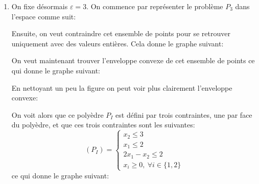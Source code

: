 {\begin{td-sol}[]
\begin{enumerate}
            

            Quelques remarques par rapport à la figure:
            \begin{itemize}
                \item Tout d'abord on peut remarquer que l'ensemble des points dans le polyèdre est complètement borné cette fois-ci.
                Contrairement au cas \(\varepsilon = -1\), on ne peut pas choisir n'importe quelle valeur pour \(x_1\).
                \item Les points extrêmes de ce polyèdre sont:
                \begin{equation*}
                    (0, 0), (0, 3), (1, 3), (4, 0)
                \end{equation*}
                \item Ces deux problèmes, même s'ils viennent tous deux de \(P_\varepsilon\) ont des représentations dans l'espace bien différentes, cela est notamment dû à l'impact qu'a le choix de \(\varepsilon\) sur le signe des variables \(x_1\) et \(x_2\) dans la seconde contrainte. C'est ce qui décide \og{}l'angle de la pente\fg{} de cette contrainte et qui permet donc de borner ou non le polyèdre.
            \end{itemize}

            \item On fixe désormais \(\varepsilon = 3\). On commence par représenter le problème \(P_3\) dans l'espace comme suit:

            

            Ensuite, on veut contraindre cet ensemble de points pour se retrouver uniquement avec des valeurs entières. 
            Cela donne le graphe suivant:

            

            On veut maintenant trouver l'enveloppe convexe de cet ensemble de points ce qui donne le graphe suivant:

            

            En nettoyant un peu la figure on peut voir plus clairement l'enveloppe convexe:

            

            On voit alors que ce polyèdre \(P_I\) est défini par trois contraintes, une par face du polyèdre, et que ces trois contraintes sont les suivantes:
            \begin{equation*}
                (P_I) = 
                \begin{cases}
                    x_2 \leq 3\\
                    x_1 \leq 2\\
                    2x_1 - x_2 \leq 2\\
                    x_i \geq 0,\ \forall i \in \{1, 2\}
                \end{cases}
            \end{equation*}
            ce qui donne le graphe suivant:


\end{enumerate}
\end{td-sol}}
